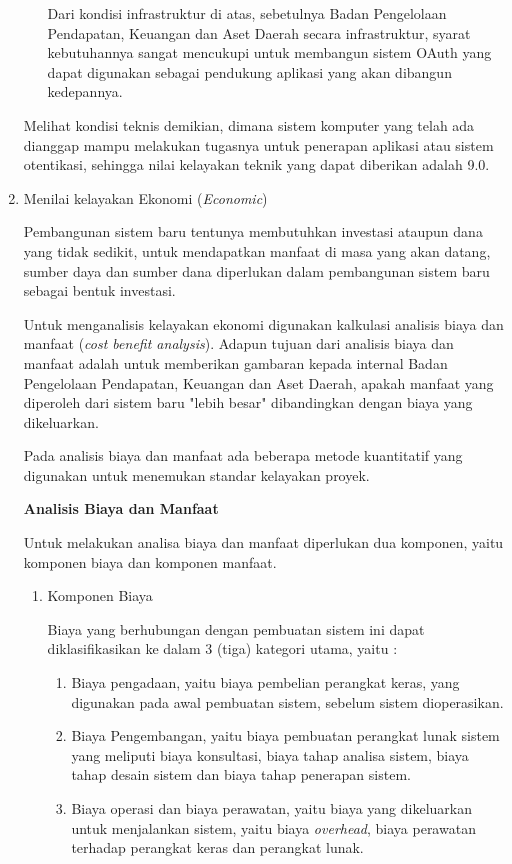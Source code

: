 \documentclass[pdftex,12pt, oneside]{article}
\begin{document}
\begin{enumerate}
\begin{enumerate}
Dari kondisi infrastruktur di atas, sebetulnya Badan Pengelolaan Pendapatan, Keuangan dan Aset Daerah secara infrastruktur, syarat kebutuhannya sangat mencukupi untuk membangun sistem OAuth yang dapat digunakan sebagai pendukung aplikasi yang akan dibangun kedepannya.

\end{enumerate}

Melihat kondisi teknis demikian, dimana sistem komputer yang telah ada dianggap mampu melakukan tugasnya untuk penerapan aplikasi atau sistem otentikasi, sehingga nilai kelayakan teknik yang dapat diberikan adalah 9.0.

	\item Menilai kelayakan Ekonomi (\textit{Economic})
	
Pembangunan sistem baru tentunya membutuhkan investasi ataupun dana yang tidak sedikit, untuk mendapatkan manfaat di masa yang akan datang, sumber daya dan sumber dana diperlukan dalam pembangunan sistem baru sebagai bentuk investasi.

Untuk menganalisis kelayakan ekonomi digunakan kalkulasi analisis biaya dan manfaat (\textit{cost benefit analysis}). Adapun tujuan dari analisis biaya dan manfaat adalah untuk memberikan gambaran kepada internal Badan Pengelolaan Pendapatan, Keuangan dan Aset Daerah, apakah manfaat yang diperoleh dari sistem baru "lebih besar" dibandingkan dengan biaya yang dikeluarkan. 

Pada analisis biaya dan manfaat ada beberapa metode kuantitatif yang digunakan untuk menemukan standar kelayakan proyek.

\textbf{Analisis Biaya dan Manfaat}

Untuk melakukan analisa biaya dan manfaat diperlukan dua komponen, yaitu komponen biaya dan komponen manfaat.

\begin{enumerate}
	\item Komponen Biaya
	
Biaya yang berhubungan dengan pembuatan sistem ini dapat diklasifikasikan ke dalam 3 (tiga) kategori utama, yaitu :

\begin{enumerate}
	\item Biaya pengadaan, yaitu biaya pembelian perangkat keras, yang digunakan pada awal pembuatan sistem, sebelum sistem dioperasikan.
	\item Biaya Pengembangan, yaitu biaya pembuatan perangkat lunak sistem yang meliputi biaya konsultasi, biaya tahap analisa sistem, biaya tahap desain sistem dan biaya tahap penerapan sistem.
	\item Biaya operasi dan biaya perawatan, yaitu biaya yang dikeluarkan untuk menjalankan sistem, yaitu biaya \textit{overhead}, biaya perawatan terhadap perangkat keras dan perangkat lunak.
\end{enumerate}	


\end{enumerate}
\end{enumerate}
\end{document}
